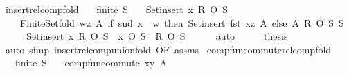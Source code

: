 \begin{isabellebody}
%
\endisatagproof
{\isafoldproof}%
%
\isadelimproof
\isanewline
%
\endisadelimproof
\isanewline
{}\isamarkupfalse%
\ insert{\isacharunderscore}{\kern0pt}relcomp{\isacharunderscore}{\kern0pt}fold{\isacharcolon}{\kern0pt}\isanewline
\ \ \ {\isachardoublequoteopen}finite\ S{\isachardoublequoteclose}\isanewline
\ \ \ {\isachardoublequoteopen}Set{\isachardot}{\kern0pt}insert\ x\ R\ O\ S\ {\isacharequal}{\kern0pt}\isanewline
\ \ \ \ Finite{\isacharunderscore}{\kern0pt}Set{\isachardot}{\kern0pt}fold\ {\isacharparenleft}{\kern0pt}{\isasymlambda}{\isacharparenleft}{\kern0pt}w{\isacharcomma}{\kern0pt}z{\isacharparenright}{\kern0pt}\ A{\isacharprime}{\kern0pt}{\isachardot}{\kern0pt}\ if\ snd\ x\ {\isacharequal}{\kern0pt}\ w\ then\ Set{\isachardot}{\kern0pt}insert\ {\isacharparenleft}{\kern0pt}fst\ x{\isacharcomma}{\kern0pt}z{\isacharparenright}{\kern0pt}\ A{\isacharprime}{\kern0pt}\ else\ A{\isacharprime}{\kern0pt}{\isacharparenright}{\kern0pt}\ {\isacharparenleft}{\kern0pt}R\ O\ S{\isacharparenright}{\kern0pt}\ S{\isachardoublequoteclose}\isanewline
%
\isadelimproof
%
\endisadelimproof
%
\isatagproof
{}\isamarkupfalse%
\ {\isacharminus}{\kern0pt}\isanewline
\ \ \isamarkupfalse%
\ {\isachardoublequoteopen}Set{\isachardot}{\kern0pt}insert\ x\ R\ O\ S\ {\isacharequal}{\kern0pt}\ {\isacharparenleft}{\kern0pt}{\isacharbraceleft}{\kern0pt}x{\isacharbraceright}{\kern0pt}\ O\ S{\isacharparenright}{\kern0pt}\ {\isasymunion}\ {\isacharparenleft}{\kern0pt}R\ O\ S{\isacharparenright}{\kern0pt}{\isachardoublequoteclose}\isanewline
\ \ \ \ \isamarkupfalse%
\ auto\isanewline
\ \ \isamarkupfalse%
\ \isamarkupfalse%
\ {\isacharquery}{\kern0pt}thesis\isanewline
\ \ \ \ \isamarkupfalse%
\ {\isacharparenleft}{\kern0pt}auto\ simp{\isacharcolon}{\kern0pt}\ insert{\isacharunderscore}{\kern0pt}relcomp{\isacharunderscore}{\kern0pt}union{\isacharunderscore}{\kern0pt}fold\ {\isacharbrackleft}{\kern0pt}OF\ assms{\isacharbrackright}{\kern0pt}{\isacharparenright}{\kern0pt}\isanewline
{}\isamarkupfalse%
%
\endisatagproof
{\isafoldproof}%
%
\isadelimproof
\isanewline
%
\endisadelimproof
\isanewline
{}\isamarkupfalse%
\ comp{\isacharunderscore}{\kern0pt}fun{\isacharunderscore}{\kern0pt}commute{\isacharunderscore}{\kern0pt}relcomp{\isacharunderscore}{\kern0pt}fold{\isacharcolon}{\kern0pt}\isanewline
\ \ \ {\isachardoublequoteopen}finite\ S{\isachardoublequoteclose}\isanewline
\ \ \ {\isachardoublequoteopen}comp{\isacharunderscore}{\kern0pt}fun{\isacharunderscore}{\kern0pt}commute\ {\isacharparenleft}{\kern0pt}{\isasymlambda}{\isacharparenleft}{\kern0pt}x{\isacharcomma}{\kern0pt}y{\isacharparenright}{\kern0pt}\ A{\isachardot}{\kern0pt}\isanewline

\end{isabellebody}
